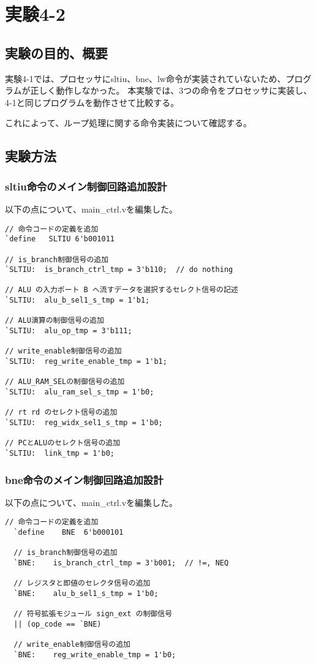 \section{実験4-2}
\subsection{実験の目的、概要}
実験4-1では、プロセッサにsltiu、bne、lw命令が実装されていないため、プログラムが正しく動作しなかった。
本実験では、3つの命令をプロセッサに実装し、4-1と同じプログラムを動作させて比較する。

これによって、ループ処理に関する命令実装について確認する。

\subsection{実験方法}
\subsubsection{sltiu命令のメイン制御回路追加設計}
以下の点について、main\_ctrl.vを編集した。
\begin{lstlisting}[caption={sltiu命令の追加設計},label={sltiu命令の追加設計}]
// 命令コードの定義を追加
`define   SLTIU 6'b001011

// is_branch制御信号の追加
`SLTIU:  is_branch_ctrl_tmp = 3'b110;  // do nothing

// ALU の入力ポート B へ流すデータを選択するセレクト信号の記述
`SLTIU:  alu_b_sel1_s_tmp = 1'b1;

// ALU演算の制御信号の追加
`SLTIU:  alu_op_tmp = 3'b111;

// write_enable制御信号の追加
`SLTIU:  reg_write_enable_tmp = 1'b1;

// ALU_RAM_SELの制御信号の追加
`SLTIU:  alu_ram_sel_s_tmp = 1'b0;

// rt rd のセレクト信号の追加
`SLTIU:  reg_widx_sel1_s_tmp = 1'b0;

// PCとALUのセレクト信号の追加
`SLTIU:  link_tmp = 1'b0;
\end{lstlisting}

\subsubsection{bne命令のメイン制御回路追加設計}
以下の点について、main\_ctrl.vを編集した。
\begin{lstlisting}[caption={bne命令の追加設計},label={bne命令の追加設計}]
  // 命令コードの定義を追加
  `define    BNE  6'b000101

  // is_branch制御信号の追加
  `BNE:    is_branch_ctrl_tmp = 3'b001;  // !=, NEQ

  // レジスタと即値のセレクタ信号の追加
  `BNE:    alu_b_sel1_s_tmp = 1'b0;

  // 符号拡張モジュール sign_ext の制御信号
  || (op_code == `BNE)                       

  // write_enable制御信号の追加
  `BNE:    reg_write_enable_tmp = 1'b0;
\end{lstlisting}

